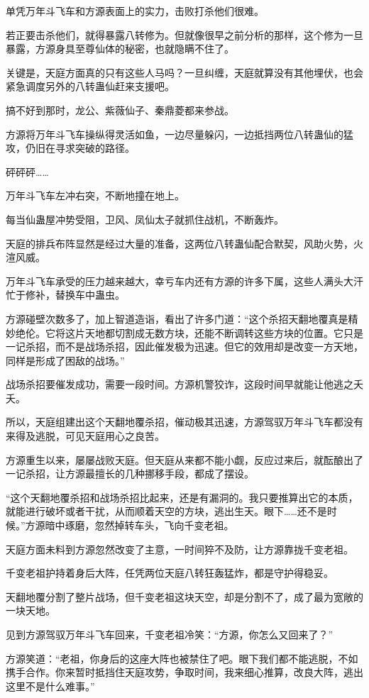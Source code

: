 \begin{this_body}
单凭万年斗飞车和方源表面上的实力，击败打杀他们很难。

若正要击杀他们，就得暴露八转修为。但就像很早之前分析的那样，这个修为一旦暴露，方源身具至尊仙体的秘密，也就隐瞒不住了。

关键是，天庭方面真的只有这些人马吗？一旦纠缠，天庭就算没有其他埋伏，也会紧急调度另外的八转蛊仙赶来支援吧。

搞不好到那时，龙公、紫薇仙子、秦鼎菱都来参战。

方源将万年斗飞车操纵得灵活如鱼，一边尽量躲闪，一边抵挡两位八转蛊仙的猛攻，仍旧在寻求突破的路径。

砰砰砰……

万年斗飞车左冲右突，不断地撞在地上。

每当仙蛊屋冲势受阻，卫风、凤仙太子就抓住战机，不断轰炸。

天庭的排兵布阵显然是经过大量的准备，这两位八转蛊仙配合默契，风助火势，火渲风威。

万年斗飞车承受的压力越来越大，幸亏车内还有方源的许多下属，这些人满头大汗忙于修补，替换车中蛊虫。

方源碰壁次数多了，加上智道造诣，看出了许多门道：“这个杀招天翻地覆真是精妙绝伦。它将这片天地都切割成无数方块，还能不断调转这些方块的位置。它只是一记杀招，而不是战场杀招，因此催发极为迅速。但它的效用却是改变一方天地，同样是形成了困敌的战场。”

战场杀招要催发成功，需要一段时间。方源机警狡诈，这段时间早就能让他逃之夭夭。

所以，天庭组建出这个天翻地覆杀招，催动极其迅速，方源驾驭万年斗飞车都没有来得及逃脱，可见天庭用心之良苦。

方源重生以来，屡屡战败天庭。但天庭从来都不能小觑，反应过来后，就酝酿出了一记杀招，让方源最擅长的几种挪移手段，都成了摆设。

“这个天翻地覆杀招和战场杀招比起来，还是有漏洞的。我只要推算出它的本质，就能进行破坏或者干扰，从而顺着天空的方块，逃出生天。眼下……还不是时候。”方源暗中琢磨，忽然掉转车头，飞向千变老祖。

天庭方面未料到方源忽然改变了主意，一时间猝不及防，让方源靠拢千变老祖。

千变老祖护持着身后大阵，任凭两位天庭八转狂轰猛炸，都是守护得稳妥。

天翻地覆分割了整片战场，但千变老祖这块天空，却是分割不了，成了最为宽敞的一块天地。

见到方源驾驭万年斗飞车回来，千变老祖冷笑：“方源，你怎么又回来了？”

方源笑道：“老祖，你身后的这座大阵也被禁住了吧。眼下我们都不能逃脱，不如携手合作。你来暂时抵挡住天庭攻势，争取时间，我来细心推算，改良大阵，逃出这里不是什么难事。”


\end{this_body}
